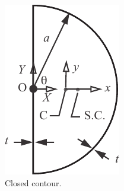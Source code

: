 \documentclass{AeroStructure-ERJohnson}
\begin{document}
\begin{figure}
\vspace*{3pt}
\includegraphics{Figure_4-27.pdf}
\caption{Closed contour.\label{fig4.27}}
\end{figure}
\vspace*{-2\baselineskip}
\end{document}
